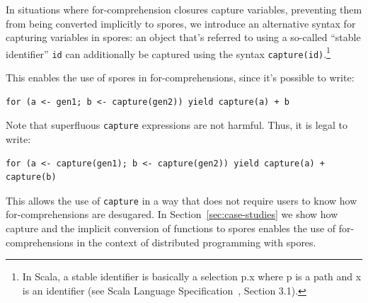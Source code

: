 \documentclass{llncs}
\begin{document}



In situations where for-comprehension closures capture variables, preventing
them from being converted implicitly to spores, we introduce an alternative
syntax for capturing variables in spores: an object that's referred to using a
so-called ``stable identifier'' \verb|id| can additionally be captured using
the syntax \verb|capture(id)|.\footnote{In Scala, a stable identifier is
basically a selection p.x where p is a path and x is an identifier (see Scala
Language Specification~\cite{ScalaSpec}, Section 3.1).}

This enables the use of spores in for-comprehensions, since it's possible to write:

\begin{lstlisting}[numbers=none]
    for (a <- gen1; b <- capture(gen2)) yield capture(a) + b
\end{lstlisting}

\noindent Note that superfluous \verb|capture| expressions are not harmful. Thus, it is
legal to write:

\begin{lstlisting}[numbers=none]
    for (a <- capture(gen1); b <- capture(gen2)) yield capture(a) + capture(b)
\end{lstlisting}

\noindent This allows the use of \verb|capture| in a way that does not require users to
know how for-comprehensions are desugared. In Section~\ref{sec:case-studies}
we show how capture and the implicit conversion of functions to spores enables
the use of for-comprehensions in the context of distributed programming with
spores.







\vspace{2mm}
\end{document}
